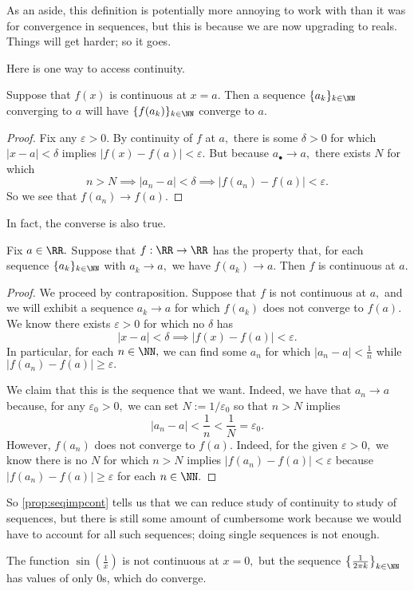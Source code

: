 \documentclass[../notes.tex]{subfiles}
\begin{document}
As an aside, this definition is potentially more annoying to work with than it was for convergence in sequences, but this is because we are now upgrading to reals. Things will get harder; so it goes.

Here is one way to access continuity.
\begin{proposition}
	Suppose that $f(x)$ is continuous at $x=a.$ Then a sequence $\{a_k\}_{k\in\NN}$ converging to $a$ will have $\{f(a_k)\}_{k\in\NN}$ converge to $a.$
\end{proposition}
\begin{proof}
	Fix any $\varepsilon>0.$ By continuity of $f$ at $a,$ there is some $\delta>0$ for which $|x-a|<\delta$ implies $|f(x)-f(a)|<\varepsilon.$ But because $a_\bullet\to a,$ there exists $N$ for which
	\[n>N\implies|a_n-a|<\delta\implies|f(a_n)-f(a)|<\varepsilon.\]
	So we see that $f(a_n)\to f(a).$
\end{proof}
In fact, the converse is also true.
\begin{proposition} \label{prop:seqimpcont}
	Fix $a\in\RR.$ Suppose that $f:\RR\to\RR$ has the property that, for each sequence $\{a_k\}_{k\in\NN}$ with $a_k\to a,$ we have $f(a_k)\to a.$ Then $f$ is continuous at $a.$
\end{proposition}
\begin{proof}
	We proceed by contraposition. Suppose that $f$ is not continuous at $a,$ and we will exhibit a sequence $a_k\to a$ for which $f(a_k)$ does not converge to $f(a).$ We know there exists $\varepsilon>0$ for which no $\delta$ has
	\[|x-a|<\delta\implies|f(x)-f(a)|<\varepsilon.\]
	In particular, for each $n\in\NN,$ we can find some $a_n$ for which $|a_n-a|<\frac1n$ while $|f(a_n)-f(a)|\ge\varepsilon.$

	We claim that this is the sequence that we want. Indeed, we have that $a_n\to a$ because, for any $\varepsilon_0>0,$ we can set $N:=1/\varepsilon_0$ so that $n>N$ implies
	\[|a_n-a|<\frac1n<\frac1N=\varepsilon_0.\]
	However, $f(a_n)$ does not converge to $f(a).$ Indeed, for the given $\varepsilon>0,$ we know there is no $N$ for which $n>N$ implies $|f(a_n)-f(a)|<\varepsilon$ because $|f(a_n)-f(a)|\ge\varepsilon$ for each $n\in\NN.$
\end{proof}
So \autoref{prop:seqimpcont} tells us that we can reduce study of continuity to study of sequences, but there is still some amount of cumbersome work because we would have to account for all such sequences; doing single sequences is not enough.
\begin{example}
	The function $\sin\left(\frac1x\right)$ is not continuous at $x=0,$ but the sequence $\left\{\frac1{2\pi k}\right\}_{k\in\NN}$ has values of only $0$s, which do converge.
\end{example}
\end{document}
